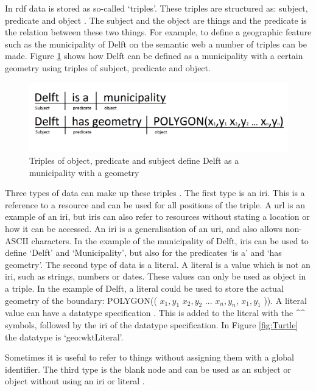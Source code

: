 In \ac{rdf} data is stored as so-called `triples'. These triples are structured as: subject, predicate and object \citep{LD:Berners-lee}. The subject and the object are things and the predicate is the relation between these two things. For example, to define a geographic feature such as the municipality of Delft on the semantic web a number of triples can be made. Figure \ref{fig:Triples} shows how Delft can be defined as a municipality with a certain geometry using triples of subject, predicate and object.

\begin{figure}
	\centering
	\includegraphics[width=0.7\linewidth]{figs/Triples.png}
	\caption{Triples of object, predicate and subject define Delft as a municipality with a geometry}
	\label{fig:Triples}
\end{figure}

Three types of data can make up these triples \citep{LD:W3C6}. The first type is an \ac{iri}. This is a reference to a resource and can be used for all positions of the triple. A \ac{url} is an example of an \ac{iri}, but \ac{iri}s can also refer to resources without stating a location or how it can be accessed. An \ac{iri} is a generalisation of an \ac{uri}, and also allows non-ASCII characters. In the example of the municipality of Delft, \ac{iri}s can be used to define `Delft' and `Municipality', but also for the predicates `is a' and `has geometry'. The second type of data is a literal. A literal is a value which is not an \ac{iri}, such as strings, numbers or dates. These values can only be used as object in a triple. In the example of Delft, a literal could be used to store the actual geometry of the boundary: POLYGON(( $x_{1},y_{1}$ $x_{2},y_{2}$ ... $x_{n},y_{n}$, $x_{1},y_{1}$ )). A literal value can have a datatype specification \citep{LD:W3C7}. This is added to the literal with the \^{}\^{} symbols, followed by the \ac{iri} of the datatype specification. In Figure \ref{fig:Turtle} the datatype is `geo:wktLiteral'.

Sometimes it is useful to refer to things without assigning them with a global identifier. The third type is the blank node and can be used as an subject or object without using an \ac{iri} or literal \citep{LD:W3C6}.  

